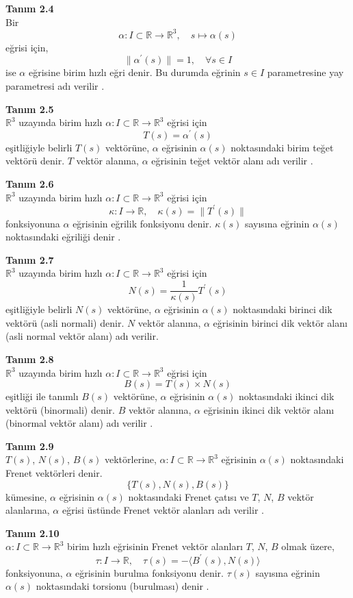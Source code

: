 \documentclass[a4paper,12pt]{article}
\begin{document}
\textbf{Tanım 2.4} \\ 
Bir 
\[
\alpha: I \subset \mathbb{R} \to \mathbb{R}^3, \quad s \mapsto \alpha(s)
\]
eğrisi için,
\[
\|\alpha^\prime(s) \| = 1, \quad \forall s \in I
\]
ise $\alpha$ eğrisine birim hızlı eğri denir. Bu durumda eğrinin $s \in I$ parametresine yay parametresi adı verilir .

\textbf{Tanım 2.5} \\ 
$\mathbb{R}^3$ uzayında birim hızlı $\alpha: I \subset \mathbb{R} \to \mathbb{R}^3$ eğrisi için
\[
T(s) = \alpha^\prime(s)
\]
eşitliğiyle belirli $T(s)$ vektörüne, $\alpha$ eğrisinin $\alpha(s)$ noktasındaki birim teğet vektörü denir. $T$ vektör alanına, $\alpha$ eğrisinin teğet vektör alanı adı verilir   .

\textbf{Tanım 2.6} \\ 
$\mathbb{R}^3$ uzayında birim hızlı $\alpha: I \subset \mathbb{R} \to \mathbb{R}^3$ eğrisi için
\[
\kappa: I \to \mathbb{R}, \quad \kappa(s) = \|T^\prime(s) \|
\]
fonksiyonuna $\alpha$ eğrisinin eğrilik fonksiyonu denir. $\kappa(s)$ sayısına eğrinin $\alpha(s)$ noktasındaki eğriliği denir   .

\textbf{Tanım 2.7} \\ 
$\mathbb{R}^3$ uzayında birim hızlı $\alpha: I \subset \mathbb{R} \to \mathbb{R}^3$ eğrisi için
\[
N(s) = \frac{1}{\kappa(s)} T^\prime(s)
\]
eşitliğiyle belirli $N(s)$ vektörüne, $\alpha$ eğrisinin $\alpha(s)$ noktasındaki birinci dik vektörü (asli normali) denir. $N$ vektör alanına, $\alpha$ eğrisinin birinci dik vektör alanı (asli normal vektör alanı) adı verilir.

\textbf{Tanım 2.8} \\
$\mathbb{R}^3$ uzayında birim hızlı $\alpha: I \subset \mathbb{R} \to \mathbb{R}^3$ eğrisi için
\[
B(s) = T(s) \times N(s)
\]
eşitliği ile tanımlı $B(s)$ vektörüne, $\alpha$ eğrisinin $\alpha(s)$ noktasındaki ikinci dik vektörü (binormali) denir. $B$ vektör alanına, $\alpha$ eğrisinin ikinci dik vektör alanı (binormal vektör alanı) adı verilir   .

\textbf{Tanım 2.9} \\
$T(s)$, $N(s)$, $B(s)$ vektörlerine, $\alpha : I \subset \mathbb{R} \to \mathbb{R}^3$ eğrisinin $\alpha(s)$ noktasındaki Frenet vektörleri denir.
\[
\{T(s), N(s), B(s)\}
\]
kümesine, $\alpha$ eğrisinin $\alpha(s)$ noktasındaki Frenet çatısı ve $T$, $N$, $B$ vektör alanlarına, $\alpha$ eğrisi üstünde Frenet vektör alanları adı verilir   .

\textbf{Tanım 2.10} \\
$\alpha: I \subset \mathbb{R} \to \mathbb{R}^3$ birim hızlı eğrisinin Frenet vektör alanları $T$, $N$, $B$ olmak üzere,
\[
\tau : I \to \mathbb{R}, \quad \tau(s) = -\langle B^\prime(s), N(s) \rangle
\]
fonksiyonuna, $\alpha$ eğrisinin burulma fonksiyonu denir. $\tau(s)$ sayısına eğrinin $\alpha(s)$ noktasındaki torsionu (burulması) denir   .
\end{document}
